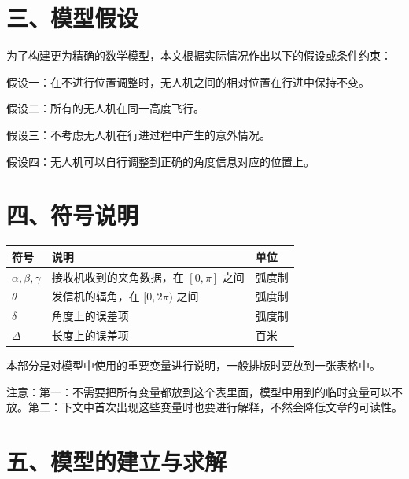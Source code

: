 \documentclass{my_paper}
\begin{document}
\section{三、模型假设}

为了构建更为精确的数学模型，本文根据实际情况作出以下的假设或条件约束：

假设一：在不进行位置调整时，无人机之间的相对位置在行进中保持不变。

假设二：所有的无人机在同一高度飞行。

假设三：不考虑无人机在行进过程中产生的意外情况。

假设四：无人机可以自行调整到正确的角度信息对应的位置上。

\newpage

\section{四、符号说明}
\begin{table}[h]%
    \centering
    \begin{tabular}{p{2.0cm}<{\centering}p{9.0cm}<{\centering}p{2.0cm}<{\centering}}
    \hline
    符号 & 说明 & 单位 \\ %
    \hline
    $\alpha,\beta,\gamma$ & 接收机收到的夹角数据，在 $[0,\pi]$ 之间 & 弧度制 \\ %
    $\theta$ & 发信机的辐角，在 $[0,2\pi)$ 之间 &  弧度制 \\ %
    $\delta$ & 角度上的误差项 & 弧度制 \\
    $\Delta$ & 长度上的误差项 & 百米 \\ %
    \hline
    \end{tabular}
\end{table}
本部分是对模型中使用的重要变量进行说明，一般排版时要放到一张表格中。

注意：第一：不需要把所有变量都放到这个表里面，模型中用到的临时变量可以不放。第二：下文中首次出现这些变量时也要进行解释，不然会降低文章的可读性。


\newpage

\section{五、模型的建立与求解}
\end{document}
